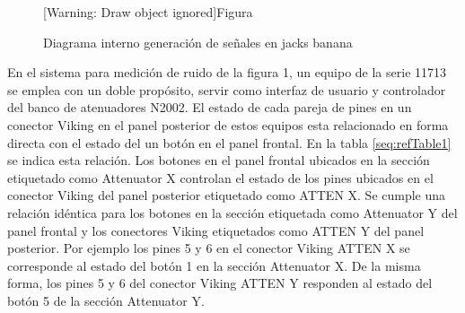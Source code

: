 \documentclass[paper=letter,oneside,fontsize=10pt,parskip=full]{article}
\newcounter{Table}
\newcounter{Drawing}
\renewcommand\theDrawing{\arabic{Drawing}}
\begin{document}
\bigskip



\begin{figure}
\centering
\begin{minipage}{17.404cm}
[Warning: Draw object ignored]Figura {\theDrawing\label{seq:refDrawing10}} 

Diagrama interno generación de señales en jacks banana
\end{minipage}
\end{figure}
En el sistema para medición de ruido de la figura 1, un equipo de la serie 11713 se emplea con un doble propósito,
servir como interfaz de usuario y controlador del banco de atenuadores N2002. El estado de cada pareja de pines en un
conector Viking en el panel posterior de estos equipos esta relacionado en forma directa con el estado del un botón en
el panel frontal. En la tabla \ref{seq:refTable1} se indica esta relación. Los botones en el panel frontal ubicados en
la sección etiquetado como Attenuator X controlan el estado de los pines ubicados en el conector Viking del panel
posterior etiquetado como ATTEN X. Se cumple una relación idéntica para los botones en la sección etiquetada como
Attenuator Y del panel frontal y los conectores Viking etiquetados como ATTEN Y del panel posterior. Por ejemplo los
pines 5 y 6 en el conector Viking ATTEN X se corresponde al estado del botón 1 en la sección Attenuator X. De la misma
forma, los pines 5 y 6 del conector Viking ATTEN Y responden al estado del botón 5 de la sección Attenuator Y.
\end{document}

